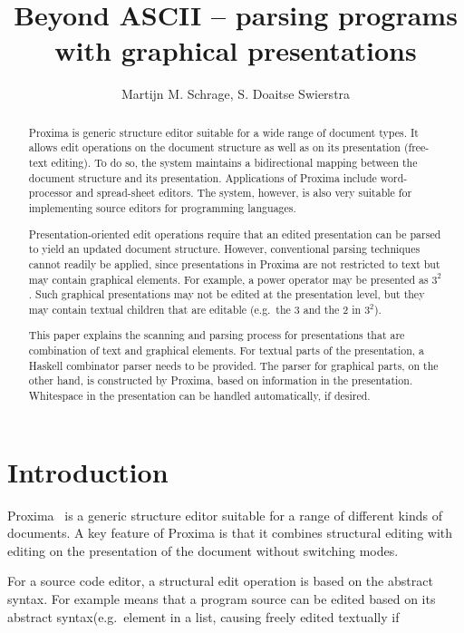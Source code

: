 \documentclass[12pt]{article}
\title{Beyond ASCII -- parsing programs with graphical presentations \\{\small \version}}
\author{Martijn M. Schrage\inst{1}, S. Doaitse Swierstra\inst{1}}
\begin{document}
 

\maketitle

\begin{abstract}

Proxima is generic structure editor suitable for a wide range of document types. It allows edit operations on the document structure as well as on its presentation (free-text editing). To do so, the system maintains a bidirectional mapping between the document structure and its presentation. Applications of Proxima include word-processor and spread-sheet editors. The system, however, is also very suitable for implementing source editors for programming languages.

Presentation-oriented edit operations require that an edited presentation can be parsed to yield an updated document structure. However, conventional parsing techniques cannot readily be applied, since presentations in Proxima are not restricted to text but may contain graphical elements. For example, a power operator may be presented as $3^2$. Such graphical presentations may not be edited at the presentation level, but they may contain textual children that are editable (e.g.\ the 3 and the 2 in $3^2$). 

This paper explains the scanning and parsing process for presentations that are combination of text and graphical elements. For textual parts of the presentation, a Haskell combinator parser needs to be provided. The parser for graphical parts, on the other hand, is constructed by Proxima, based on information in the presentation. Whitespace in the presentation can be handled automatically, if desired. 
\end{abstract}


\section{Introduction}

Proxima~\cite{schrage04Proxima} is a generic structure editor suitable for a range of different kinds of documents. A key feature of Proxima is that it combines structural editing with editing on the presentation of the document without switching modes. 


For a source code editor, a structural edit operation is based on the abstract syntax. For example means that a program source can be edited based on its abstract syntax(e.g.\ element in a list, causing freely edited textually if 
\end{document}
